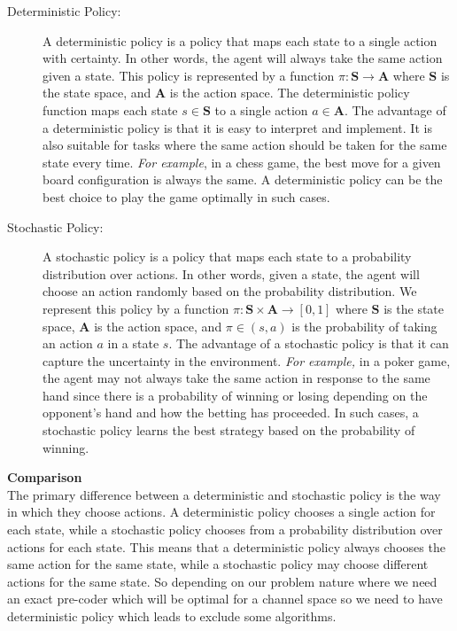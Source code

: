 \begin{description}
    \item[Deterministic Policy:] A deterministic policy is a policy that maps each state to a single action with certainty. In other words, the agent will always take the same action given a state. This policy is represented by a function $\pi : \mathbf{S} \rightarrow \mathbf{A}$ where $\mathbf{S}$ is the state space, and $\mathbf{A}$ is the action space. The deterministic policy function maps each state $s \in \mathbf{S}$ to a single action $a \in \mathbf{A}$.
    The advantage of a deterministic policy is that it is easy to interpret and implement. It is also suitable for tasks where the same action should be taken for the same state every time. \textit{For example}, in a chess game, the best move for a given board configuration is always the same. A deterministic policy can be the best choice to play the game optimally in such cases.    
    \item[Stochastic Policy:] A stochastic policy is a policy that maps each state to a probability distribution over actions. In other words, given a state, the agent will choose an action randomly based on the probability distribution. We represent this policy by a function $\pi : \mathbf{S} \times \mathbf{A} \rightarrow [0, 1]$ where $\mathbf{S}$ is the state space, $\mathbf{A}$ is the action space, and $\pi \in (s,a)$ is the probability of taking an action $a$ in a state $s$.
    The advantage of a stochastic policy is that it can capture the uncertainty in the environment. \textit{For example,} in a poker game, the agent may not always take the same action in response to the same hand since there is a probability of winning or losing depending on the opponent's hand and how the betting has proceeded. In such cases, a stochastic policy learns the best strategy based on the probability of winning.    
\end{description}

\textbf{Comparison}\\
The primary difference between a deterministic and stochastic policy is the way in which they choose actions. A deterministic policy chooses a single action for each state, while a stochastic policy chooses from a probability distribution over actions for each state. This means that a deterministic policy always chooses the same action for the same state, while a stochastic policy may choose different actions for the same state.
So depending on our problem nature where we need an exact pre-coder which will be optimal for a channel space so we need to have deterministic policy which leads to exclude some algorithms.

